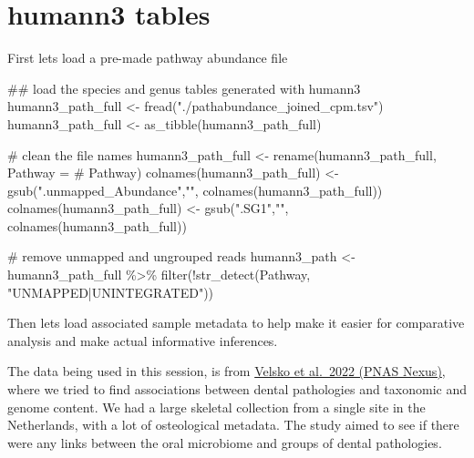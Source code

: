 \documentclass[
  letterpaper,
]{book}
\newenvironment{Shaded}{}{}
\newcommand{\AttributeTok}[1]{\textcolor[rgb]{0.84,0.23,0.29}{#1}}
\newcommand{\CommentTok}[1]{\textcolor[rgb]{0.42,0.45,0.49}{#1}}
\newcommand{\DocumentationTok}[1]{\textcolor[rgb]{0.42,0.45,0.49}{#1}}
\newcommand{\FunctionTok}[1]{\textcolor[rgb]{0.44,0.26,0.76}{#1}}
\newcommand{\NormalTok}[1]{\textcolor[rgb]{0.14,0.16,0.18}{#1}}
\newcommand{\OtherTok}[1]{\textcolor[rgb]{0.44,0.26,0.76}{#1}}
\newcommand{\SpecialCharTok}[1]{\textcolor[rgb]{0.00,0.36,0.77}{#1}}
\newcommand{\StringTok}[1]{\textcolor[rgb]{0.01,0.18,0.38}{#1}}
\begin{document}
\hypertarget{humann3-tables}{%
\section{humann3 tables}\label{humann3-tables}}

First lets load a pre-made pathway abundance file

\begin{Shaded}
\begin{Highlighting}[]
\DocumentationTok{\#\# load the species and genus tables generated with humann3}
\NormalTok{humann3\_path\_full }\OtherTok{\textless{}{-}} \FunctionTok{fread}\NormalTok{(}\StringTok{"./pathabundance\_joined\_cpm.tsv"}\NormalTok{)}
\NormalTok{humann3\_path\_full }\OtherTok{\textless{}{-}} \FunctionTok{as\_tibble}\NormalTok{(humann3\_path\_full)}

\CommentTok{\# clean the file names}
\NormalTok{humann3\_path\_full }\OtherTok{\textless{}{-}} \FunctionTok{rename}\NormalTok{(humann3\_path\_full, }\AttributeTok{Pathway =} \StringTok{\textasciigrave{}}\AttributeTok{\# Pathway}\StringTok{\textasciigrave{}}\NormalTok{)}
\FunctionTok{colnames}\NormalTok{(humann3\_path\_full) }\OtherTok{\textless{}{-}} \FunctionTok{gsub}\NormalTok{(}\StringTok{".unmapped\_Abundance"}\NormalTok{,}\StringTok{""}\NormalTok{, }\FunctionTok{colnames}\NormalTok{(humann3\_path\_full))}
\FunctionTok{colnames}\NormalTok{(humann3\_path\_full) }\OtherTok{\textless{}{-}} \FunctionTok{gsub}\NormalTok{(}\StringTok{".SG1"}\NormalTok{,}\StringTok{""}\NormalTok{, }\FunctionTok{colnames}\NormalTok{(humann3\_path\_full))}

\CommentTok{\# remove unmapped and ungrouped reads}
\NormalTok{humann3\_path }\OtherTok{\textless{}{-}}\NormalTok{ humann3\_path\_full }\SpecialCharTok{\%\textgreater{}\%} \FunctionTok{filter}\NormalTok{(}\SpecialCharTok{!}\FunctionTok{str\_detect}\NormalTok{(Pathway, }\StringTok{"UNMAPPED|UNINTEGRATED"}\NormalTok{))}
\end{Highlighting}
\end{Shaded}

Then lets load associated sample metadata to help make it easier for
comparative analysis and make actual informative inferences.

The data being used in this session, is from
\href{https://doi.org/10.1093/pnasnexus/pgac148}{Velsko et al.~2022
(PNAS Nexus)}, where we tried to find associations between dental
pathologies and taxonomic and genome content. We had a large skeletal
collection from a single site in the Netherlands, with a lot of
osteological metadata. The study aimed to see if there were any links
between the oral microbiome and groups of dental pathologies.
\end{document}
